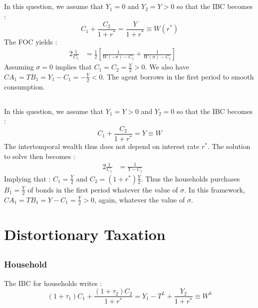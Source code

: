 \documentclass{article}
\begin{document}
\subsection{}
In this question, we assume that $Y_1 = 0$ and $Y_2 = Y > 0$ so that the IBC becomes :
\begin{equation}
    C_1 + \frac{C_2}{1 + r^*} = \frac{Y}{1 + r^*} \equiv W(r^*)
\end{equation}
The FOC yields :
\begin{alignat}{2}
    \frac{1}{C_1}  &= \frac{1}{2}\left[ \frac{1}{W(-\sigma)-C_1} + \frac{1}{W(\sigma)- C_1}  \right]   &\quad\
\end{alignat}
Assuming $\sigma = 0$ implies that $\displaystyle C_1 = C_2 = \frac{Y}{2} > 0$.\newline
We also have $\displaystyle CA_1 = TB_1 = Y_1 - C_1 = - \frac{Y}{2} < 0$.\newline
The agent borrows in the first period to smooth consumption.
\subsection{}
In this question, we assume that $Y_1 = Y > 0$ and $Y_2 = 0$ so that the IBC becomes :
\begin{equation}
    C_1 + \frac{C_2}{1 + r^*} = Y \equiv W
\end{equation}
The intertemporal wealth thus does not depend on interest rate $r^*$.
The solution to solve then becomes :
\begin{alignat}{2}
    \frac{1}{C_1}  &= \frac{1}{Y-C_1}   &\quad\
\end{alignat}
Implying that : $C_1 = \displaystyle \frac{Y}{2}$ and $C_2 = (1 + r^*) \displaystyle \frac{Y}{2}$.\newline
Thus the households purchases $B_1 = \displaystyle \frac{Y}{2}$ of bonds in the first period whatever the value of $\sigma$.\newline
In this framework, $CA_1 = TB_1 = Y - C_1 = \displaystyle \frac{Y}{2} > 0$, again, whatever the value of $\sigma$.



\newpage
\section{Distortionary Taxation}
\subsection{}
\subsubsection*{Household}
The IBC for households writes :
\begin{equation}
    (1 + \tau_1)C_1 + \frac{(1+\tau_2)C_2}{1+r^*} = Y_1 - T^L + \frac{Y_2}{1+r^*} \equiv W^h
\end{equation}
\end{document}
